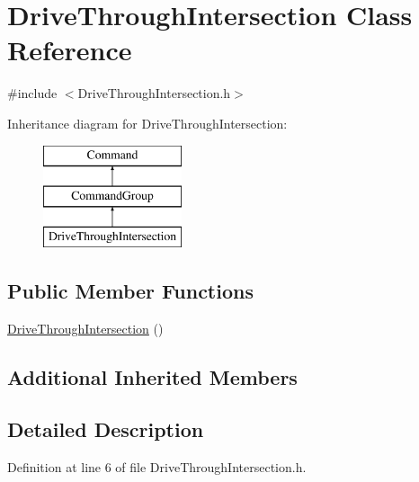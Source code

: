 \hypertarget{classDriveThroughIntersection}{\section{Drive\-Through\-Intersection Class Reference}
\label{classDriveThroughIntersection}
}


{\ttfamily \#include $<$Drive\-Through\-Intersection.\-h$>$}

Inheritance diagram for Drive\-Through\-Intersection\-:\begin{figure}[H]
\begin{center}
\leavevmode
\includegraphics[height=3.000000cm]{classDriveThroughIntersection}
\end{center}
\end{figure}
\subsection*{Public Member Functions}
\begin{DoxyCompactItemize}
\item 
\hyperlink{classDriveThroughIntersection_ab294711ce88640b5ee19fc0c609e0fbd}{Drive\-Through\-Intersection} ()
\end{DoxyCompactItemize}
\subsection*{Additional Inherited Members}


\subsection{Detailed Description}


Definition at line 6 of file Drive\-Through\-Intersection.\-h.



